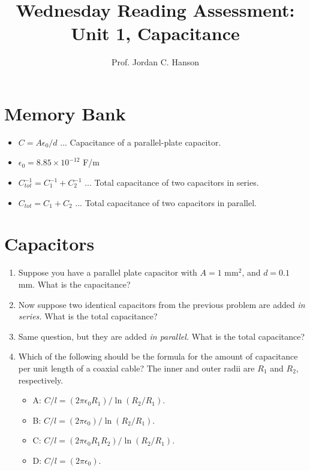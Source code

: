 \documentclass{article}
\begin{document}
\title{Wednesday Reading Assessment: Unit 1, Capacitance}
\author{Prof. Jordan C. Hanson}

\maketitle

\section{Memory Bank}

\begin{itemize}
\item $C = A\epsilon_0/d$ ... Capacitance of a parallel-plate capacitor.
\item $\epsilon_0 = 8.85 \times 10^{-12}$ F/m
\item $C_{tot}^{-1} = C_1^{-1} + C_2^{-1}$ ... Total capacitance of two capacitors in series.
\item $C_{tot} = C_1 + C_2$ ... Total capacitance of two capacitors in parallel.
\end{itemize}

\section{Capacitors}

\begin{enumerate}
\item Suppose you have a parallel plate capacitor with $A = 1$ mm$^2$, and $d = 0.1$ mm.  What is the capacitance? \\ \vspace{1cm}
\item Now suppose two identical capacitors from the previous problem are added \textit{in series.}  What is the total capacitance? \\ \vspace{1cm}
\item Same question, but they are added \textit{in parallel.} What is the total capacitance? \\ \vspace{1cm}
\item Which of the following should be the formula for the amount of capacitance per unit length of a coaxial cable?  The inner and outer radii are $R_1$ and $R_2$, respectively.
\begin{itemize}
\item A: $C/l = (2\pi\epsilon_0 R_1)/\ln(R_2/R_1)$.
\item B: $C/l = (2\pi\epsilon_0)/\ln(R_2/R_1)$.
\item C: $C/l = (2\pi\epsilon_0 R_1 R_2)/\ln(R_2/R_1)$.
\item D: $C/l = (2\pi\epsilon_0)$.
\end{itemize}
\end{enumerate}
\end{document}

